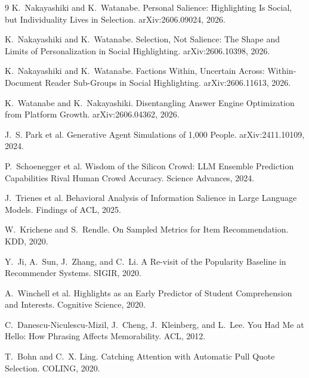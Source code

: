 \documentclass[11pt]{article}
\begin{document}
\begin{thebibliography}{9}
 K.~Nakayashiki and K.~Watanabe. Personal Salience:
Highlighting Is Social, but Individuality Lives in Selection. arXiv:2606.09024, 2026.

 K.~Nakayashiki and K.~Watanabe. Selection, Not Salience: The
Shape and Limits of Personalization in Social Highlighting. arXiv:2606.10398, 2026.

 K.~Nakayashiki and K.~Watanabe. Factions Within, Uncertain
Across: Within-Document Reader Sub-Groups in Social Highlighting. arXiv:2606.11613, 2026.

 K.~Watanabe and K.~Nakayashiki. Disentangling Answer Engine
Optimization from Platform Growth. arXiv:2606.04362, 2026.

 J.~S. Park et al. Generative Agent Simulations of 1,000 People.
arXiv:2411.10109, 2024.

 P.~Schoenegger et al. Wisdom of the Silicon Crowd: LLM Ensemble
Prediction Capabilities Rival Human Crowd Accuracy. Science Advances, 2024.

 J.~Trienes et al. Behavioral Analysis of Information Salience in Large
Language Models. Findings of ACL, 2025.

 W.~Krichene and S.~Rendle. On Sampled Metrics for Item Recommendation.
KDD, 2020.

 Y.~Ji, A.~Sun, J.~Zhang, and C.~Li. A Re-visit of the Popularity
Baseline in Recommender Systems. SIGIR, 2020.

 A.~Winchell et al. Highlights as an Early Predictor of Student
Comprehension and Interests. Cognitive Science, 2020.

 C.~Danescu-Niculescu-Mizil, J.~Cheng, J.~Kleinberg, and L.~Lee. You Had Me
at Hello: How Phrasing Affects Memorability. ACL, 2012.

 T.~Bohn and C.~X. Ling. Catching Attention with Automatic Pull Quote
Selection. COLING, 2020.
\end{thebibliography}
\end{document}
